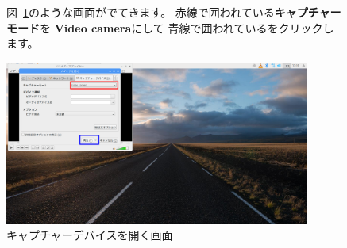 \begin{figure}[ht]
  \flushleft
  図~\ref{fig:28}のような画面がでてきます。
  赤線で囲われている\textbf{キャプチャーモード}を
  \textbf{Video camera}にして
  青線で囲われている\textbf{}をクリックします。

  \centering
  \begin{minipage}{10cm}
    \includegraphics[width=10cm]{text01-img/textbook-img117.png}
    \caption{キャプチャーデバイスを開く画面}\label{fig:28}
  \end{minipage}


\end{figure}


